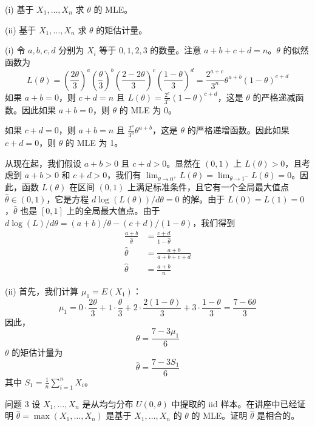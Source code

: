 \begin{questions}
(i) 基于 $X_1, \dots, X_n$ 求 $\theta$ 的 MLE。

(ii) 基于 $X_1, \dots, X_n$ 求 $\theta$ 的矩估计量。

\begin{solution}
(i) 令 $a, b, c, d$ 分别为 $X_i$ 等于 $0, 1, 2, 3$ 的数量。注意 $a + b + c + d = n$。$\theta$ 的似然函数为
\[
L(\theta) = \left(\frac{2\theta}{3}\right)^a \left(\frac{\theta}{3}\right)^b \left(\frac{2-2\theta}{3}\right)^c \left(\frac{1-\theta}{3}\right)^d = \frac{2^{a+c}}{3^n} \theta^{a+b} (1-\theta)^{c+d}
\]
如果 $a + b = 0$，则 $c + d = n$ 且 $L(\theta) = \frac{2^c}{3^n}(1-\theta)^{c+d}$，这是 $\theta$ 的严格递减函数。因此如果 $a + b = 0$，则 $\theta$ 的 MLE 为 0。

如果 $c + d = 0$，则 $a + b = n$ 且 $\frac{2^a}{3^n}\theta^{a+b}$，这是 $\theta$ 的严格递增函数。因此如果 $c + d = 0$，则 $\theta$ 的 MLE 为 1。

从现在起，我们假设 $a + b > 0$ 且 $c + d > 0$。显然在 $(0, 1)$ 上 $L(\theta) > 0$，且考虑到 $a + b > 0$ 和 $c + d > 0$，我们有 $\lim_{\theta \to 0^+} L(\theta) = \lim_{\theta \to 1^-} L(\theta) = 0$。因此，函数 $L(\theta)$ 在区间 $(0, 1)$ 上满足标准条件，且它有一个全局最大值点 $\hat{\theta} \in (0, 1)$，它是方程 $d \log(L(\theta))/d\theta = 0$ 的解。由于 $L(0) = L(1) = 0$，$\hat{\theta}$ 也是 $[0, 1]$ 上的全局最大值点。由于 $d \log(L)/d\theta = (a+b)/\theta - (c+d)/(1-\theta)$，我们得到
\begin{align*}
\frac{a + b}{\hat{\theta}} &= \frac{c + d}{1 - \hat{\theta}} \\
\hat{\theta} &= \frac{a + b}{a + b + c + d} \\
\hat{\theta} &= \frac{a + b}{n}
\end{align*}

(ii) 首先，我们计算 $\mu_1 = E(X_1)$：
\[
\mu_1 = 0 \cdot \frac{2\theta}{3} + 1 \cdot \frac{\theta}{3} + 2 \cdot \frac{2(1-\theta)}{3} + 3 \cdot \frac{1-\theta}{3} = \frac{7 - 6\theta}{3}
\]
因此，
\[
\theta = \frac{7 - 3\mu_1}{6}
\]
$\theta$ 的矩估计量为
\[
\hat{\theta} = \frac{7 - 3S_1}{6}
\]
其中 $S_1 = \frac{1}{n} \sum_{i=1}^n X_i$。
\end{solution}

\question 问题 3 设 $X_1, \dots, X_n$ 是从均匀分布 $U(0, \theta)$ 中提取的 iid 样本。在讲座中已经证明 $\hat{\theta} = \max(X_1, \dots, X_n)$ 是基于 $X_1, \dots, X_n$ 的 $\theta$ 的 MLE。证明 $\hat{\theta}$ 是相合的。


\end{questions}
